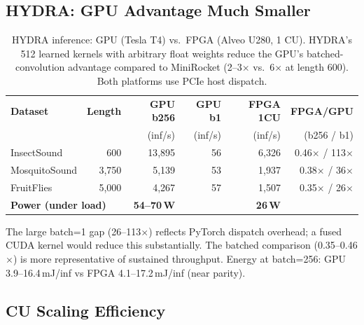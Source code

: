\documentclass[11pt]{article}
\begin{document}
\subsection{HYDRA: GPU Advantage Much Smaller}

\begin{table}[H]
\centering
\caption{HYDRA inference: GPU (Tesla T4) vs.\ FPGA (Alveo U280, 1 CU).
HYDRA's 512 learned kernels with arbitrary float weights reduce the GPU's
batched-convolution advantage compared to MiniRocket (2--3$\times$ vs.\
6$\times$ at length 600). Both platforms use PCIe host dispatch.}
\label{tab:hydra_gpu}
\begin{tabular}{l r r r r r}
\toprule
\textbf{Dataset} & \textbf{Length} & \textbf{GPU b256} & \textbf{GPU b1} & \textbf{FPGA 1CU} & \textbf{FPGA/GPU} \\
 & & (inf/s) & (inf/s) & (inf/s) & (b256 / b1) \\
\midrule
InsectSound   & 600   & 13{,}895 & 56  & 6{,}326 & 0.46$\times$ / 113$\times$ \\
MosquitoSound & 3{,}750 & 5{,}139  & 53  & 1{,}937 & 0.38$\times$ / 36$\times$ \\
FruitFlies    & 5{,}000 & 4{,}267  & 57  & 1{,}507 & 0.35$\times$ / 26$\times$ \\
\midrule
\multicolumn{2}{l}{\textbf{Power (under load)}} & \textbf{54--70\,W} & & \textbf{26\,W} & \\
\bottomrule
\end{tabular}

\vspace{0.3em}

\begin{minipage}{\textwidth}
\footnotesize
The large batch=1 gap (26--113$\times$) reflects PyTorch dispatch overhead;
a fused CUDA kernel would reduce this substantially.
The batched comparison (0.35--0.46$\times$) is more representative of sustained throughput.
Energy at batch=256: GPU 3.9--16.4\,mJ/inf vs FPGA 4.1--17.2\,mJ/inf (near parity).
\end{minipage}
\end{table}

\subsection{CU Scaling Efficiency}
\end{document}
